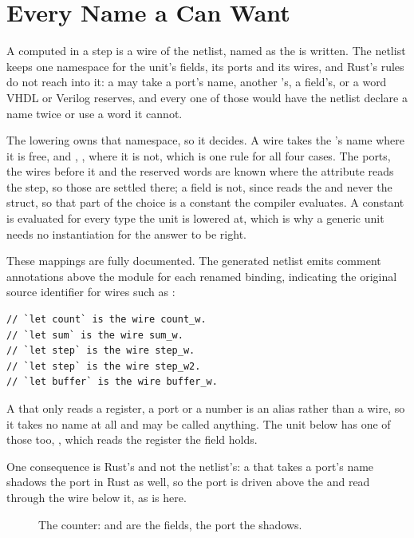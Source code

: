 \section{Every Name a  Can Want}
\label{sec:x-names}

A computed  in a step is a wire of the netlist, named as the
 is written. The netlist keeps one namespace for the unit's
fields, its ports and its wires, and Rust's rules do not reach into
it: a  may take a port's name, another 's, a
field's, or a word VHDL or Verilog reserves, and every one of those
would have the netlist declare a name twice or use a word it cannot.

The lowering owns that namespace, so it decides. A wire takes the
's name where it is free, and , ,
 where it is not, which is one rule for all four cases. The
ports, the wires before it and the reserved words are known where the
attribute reads the step, so those are settled there; a field is not,
since \code{\#[lower]} reads the  and never the struct, so
that part of the choice is a constant the compiler evaluates. A
constant is evaluated for every type the unit is lowered at, which is
why a generic unit needs no instantiation for the answer to be right.

These mappings are fully documented. The generated netlist emits
comment annotations above the module for each renamed  binding,
indicating the original source identifier for wires such as :

\begin{lstlisting}[style=ascii]
// `let count` is the wire count_w.
// `let sum` is the wire sum_w.
// `let step` is the wire step_w.
// `let step` is the wire step_w2.
// `let buffer` is the wire buffer_w.
\end{lstlisting}

A  that only reads a register, a port or a number is an
alias rather than a wire, so it takes no name at all and may be called
anything. The unit below has one of those too, , which
reads the register the field  holds.

One consequence is Rust's and not the netlist's: a  that
takes a port's name shadows the port in Rust as well, so the port is
driven above the  and read through the wire below it, as
 is here.

\begin{figure}[htbp]
\centering

\caption{The counter:  and  are the fields,
 the port the  shadows.}
\label{fig:x-names}
\end{figure}




